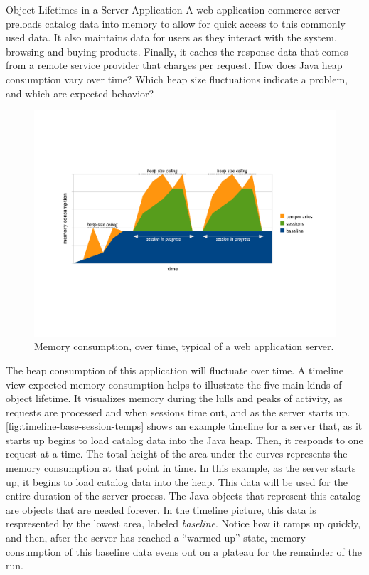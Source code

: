 \begin{example}{Object Lifetimes in a Server Application}
A web application commerce server preloads catalog data into memory to allow for
quick access to this commonly used data. It also maintains data for users as they
interact with the system, browsing and buying products. Finally, it 
caches the response data that comes from a remote service provider that charges
per request. How does Java heap consumption vary over time? Which heap size
fluctuations indicate a problem, and which are expected behavior?
\end{example}

\begin{figure}
	\centering
	\includegraphics[width=\textwidth]{Figures/lifetime/timeline-base-session-temps}
	\caption{Memory consumption, over time, typical of a web application server.}
	\label{fig:timeline-base-session-temps}
\end{figure}

The heap consumption of this application will fluctuate over time. A timeline
view expected memory consumption helps to illustrate the five main kinds of
object lifetime. It visualizes memory during the lulls and peaks of activity, as
requests are processed and when sessions time out, and as the server starts up.
 \autoref{fig:timeline-base-session-temps} shows an example timeline
for a server that, as it starts up begins to load catalog data into the Java heap.
Then, it responds to one request at a time. The total height of the area under
the curves represents the memory consumption at that point in time. 
In this example, as the server starts up, it begins to load catalog data into
the heap. This data will be used for the entire duration of the server process.
The Java objects that represent this catalog are objects that are needed
forever. In the timeline picture, this data is respresented by the lowest area,
labeled \emph{baseline}. Notice how it ramps up quickly, and then, after the
server has reached a ``warmed up'' state, memory consumption of this baseline
data evens out on a plateau for the remainder of the run.

